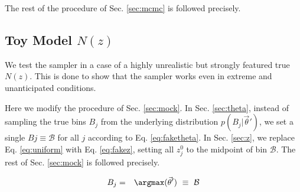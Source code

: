 \documentclass[preprint]{aastex}
\begin{document}
The rest of the procedure of Sec. \ref{sec:mcmc} is followed precisely.

%
%
%

\clearpage
\subsection{Toy Model $N(z)$}
\label{sec:fake}

We test the sampler in a case of a highly unrealistic but strongly featured true $N(z)$.  This is done to show that the sampler works even in extreme and unanticipated conditions.

Here we modify the procedure of Sec. \ref{sec:mock}.  In Sec. \ref{sec:theta}, instead of sampling the true bins $B_{j}$ from the underlying distribution $p(B_{j}|\vec{\theta}')$, we set a single $B{j}\equiv\mathcal{B}$ for all $j$ according to Eq. \ref{eq:faketheta}.  In Sec. \ref{sec:z}, we replace Eq. \ref{eq:uniform} with Eq. \ref{eq:fakez}, setting all $z^{0}_{j}$ to the midpoint of bin $\mathcal{B}$.  The rest of Sec. \ref{sec:mock} is followed precisely.

\begin{eqnarray}
\label{eq:faketheta}
B_{j} &=& \argmax(\vec{\theta}')\ \equiv\ \mathcal{B}
\end{eqnarray}
\end{document}
